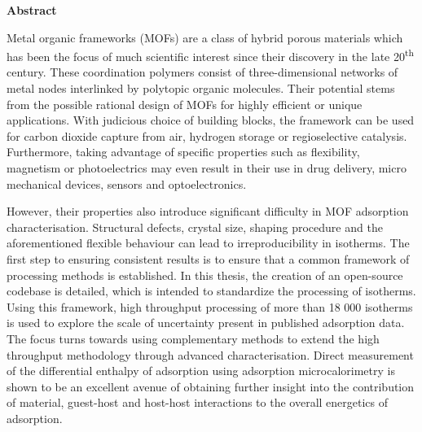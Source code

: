 
\thispagestyle{empty}


\begin{minipage}{\textwidth}
    {\footnotesize

\vspace{1cm}

{\normalsize\noindent\textbf{Abstract}}

\noindent\makebox[\linewidth]{\rule{\linewidth}{0.4pt}}
\setlength{\parindent}{15pt}

Metal organic frameworks (MOFs) are a class of hybrid porous materials
which has been the focus of much scientific interest since their
discovery in the late 20\textsuperscript{th} century. These
coordination polymers consist of three-dimensional networks of 
metal nodes interlinked by polytopic organic molecules. Their 
potential stems from the possible rational design
of \glspl{MOF} for highly efficient or unique applications. 
With judicious choice of building blocks, the framework can be used for
carbon dioxide capture from air, hydrogen storage or regioselective 
catalysis. Furthermore, taking advantage of specific properties such 
as flexibility, magnetism or photoelectrics may even result in 
their use in drug delivery, micro mechanical devices,
sensors and optoelectronics.

However, their properties also introduce significant difficulty
in \gls{MOF} adsorption characterisation.
Structural defects, crystal size, shaping procedure
and the aforementioned flexible behaviour can lead to irreproducibility 
in isotherms. The first step to ensuring consistent results
is to ensure that a common framework of processing methods is 
established. In this thesis, the creation of an open-source codebase
is detailed, which is intended to standardize the processing of 
isotherms. Using this framework, high throughput processing of more
than 18 000 isotherms is used to explore the scale of uncertainty 
present in published adsorption data.
The focus turns towards using complementary methods to extend the
high throughput methodology through advanced characterisation.
Direct measurement of the differential enthalpy of adsorption
using adsorption microcalorimetry is shown to be an excellent
avenue of obtaining further insight into the contribution of material, 
guest-host and host-host interactions to the overall energetics of
adsorption.

}
\end{minipage}
